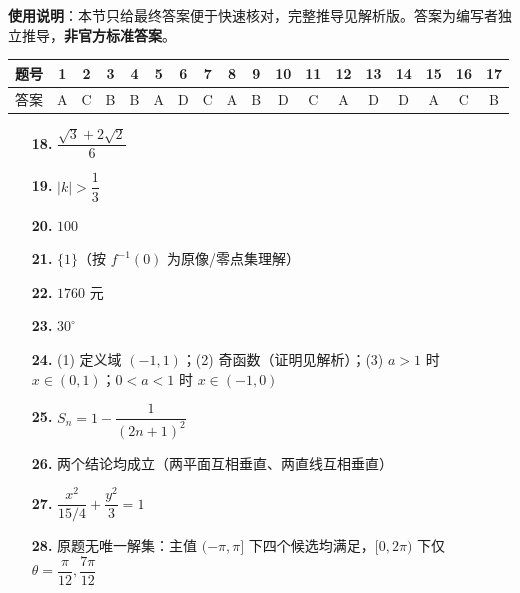 
\begin{gknotice}
\textbf{使用说明}：本节只给最终答案便于快速核对，完整推导见解析版。答案为编写者独立推导，\textbf{非官方标准答案}。
\end{gknotice}

\begin{center}\begin{tabular}{cccccccccccccccccc}
\toprule
题号 & 1 & 2 & 3 & 4 & 5 & 6 & 7 & 8 & 9 & 10 & 11 & 12 & 13 & 14 & 15 & 16 & 17 \\
\midrule
答案 & A & C & B & B & A & D & C & A & B & D & C & A & D & D & A & C & B \\
\bottomrule
\end{tabular}\end{center}

\begin{itemize}[leftmargin=2.6em]
  \item[\textbf{18.}] \(\dfrac{\sqrt3+2\sqrt2}{6}\)
  \item[\textbf{19.}] \(|k|>\dfrac13\)
  \item[\textbf{20.}] \(100\)
  \item[\textbf{21.}] \(\{1\}\)（按 \(f^{-1}(0)\) 为原像/零点集理解）
  \item[\textbf{22.}] \(1760\) 元
  \item[\textbf{23.}] \(30^\circ\)
\end{itemize}

\begin{itemize}[leftmargin=2.6em]
  \item[\textbf{24.}] (1) 定义域 \((-1,1)\)；(2) 奇函数（证明见解析）；(3) \(a>1\) 时 \(x\in(0,1)\)；\(0<a<1\) 时 \(x\in(-1,0)\)
  \item[\textbf{25.}] \(S_n=1-\dfrac{1}{(2n+1)^2}\)
  \item[\textbf{26.}] 两个结论均成立（两平面互相垂直、两直线互相垂直）
  \item[\textbf{27.}] \(\dfrac{x^2}{15/4}+\dfrac{y^2}{3}=1\)
  \item[\textbf{28.}] 原题无唯一解集：主值 \((-\pi,\pi]\) 下四个候选均满足，\([0,2\pi)\) 下仅 \(\theta=\dfrac{\pi}{12},\dfrac{7\pi}{12}\)
\end{itemize}
